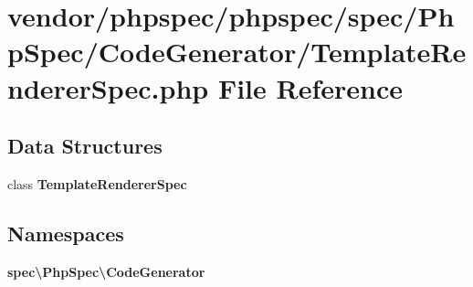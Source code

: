 \section{vendor/phpspec/phpspec/spec/\+Php\+Spec/\+Code\+Generator/\+Template\+Renderer\+Spec.php File Reference}
\label{_template_renderer_spec_8php}
\subsection*{Data Structures}
\begin{DoxyCompactItemize}
\item 
class {\bf Template\+Renderer\+Spec}
\end{DoxyCompactItemize}
\subsection*{Namespaces}
\begin{DoxyCompactItemize}
\item 
 {\bf spec\textbackslash{}\+Php\+Spec\textbackslash{}\+Code\+Generator}
\end{DoxyCompactItemize}
